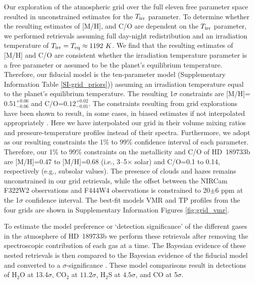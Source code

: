 \documentclass[sn-standardnature]{sn-jnl}%
\begin{document}
Our exploration of the atmospheric grid over the full eleven free parameter space resulted in unconstrained estimates for the $T_{\rm irr}$ parameter. To determine whether the resulting estimates of [M/H], and C/O are dependent on the $T_{\rm irr}$ parameter, we performed retrievals assuming full day-night redistribution and an irradiation temperature of $T_{\rm irr}=T_{\rm eq}\approx1192~K$. We find that the resulting estimates of [M/H] and C/O are consistent whether the irradiation temperature parameter is a free parameter or assumed to be the planet's equilibrium temperature. Therefore, our fiducial model is the ten-parameter model (Supplementary Information Table \ref{SI-grid_priors})) assuming an irradiation temperature equal to the planet's equilibrium temperature. The resulting 1$\sigma$ constraints are [M/H]=$0.51^{+0.06}_{-0.06}$ and  C/O=$0.12^{+0.02}_{-0.01}$. The constraints resulting from grid explorations have been shown to result, in some cases, in biased estimates if not interpolated appropriately . Here we have interpolated our grid in their volume mixing ratios and pressure-temperature profiles instead of their spectra. Furthermore, we adopt as our resulting constraints the 1\% to 99\% confidence interval of each parameter. Therefore, our 1\% to 99\% constraints on the metallicity and C/O of HD~189733b are  [M/H]=0.47 to [M/H]=0.68 (i.e., 3--5$\times$ solar) and C/O=0.1 to 0.14, respectively (e.g., subsolar values). The presence of clouds and hazes remains unconstrained in our grid retrievals, while the offset between the NIRCam F322W2 observations and F444W4 observations is constrained to 20$\pm$6 ppm at the 1$\sigma$ confidence interval. The best-fit models VMR and TP profiles from the four grids are shown in Supplementary Information Figures \ref{fig:grid_vmr}.

To estimate the model preference or `detection significance' of the different gases in the atmosphere of HD~189733b we perform these retrievals after removing the spectroscopic contribution of each gas at a time. The Bayesian evidence of these nested retrievals is then compared to the Bayesian evidence of the fiducial model and converted to a $\sigma$-significance . These model comparisons result in detections of H$_2$O at 13.4$\sigma$, CO$_2$ at $11.2\sigma$, H$_2$S at $4.5\sigma$, and CO at 5$\sigma$. 
\end{document}
